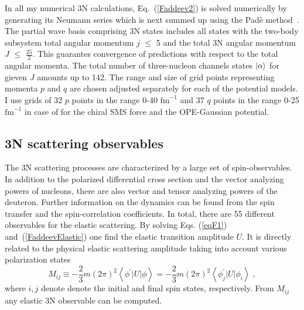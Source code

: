 In all my numerical 3N calculations, Eq.~(\ref{Faddeev2}) is solved numerically by generating its Neumann series which
is next summed up using the Pad\`e method~\cite{Glockle1996, glockle1983quantum}. The partial wave basis comprising 3N states includes all states with the two-body subsystem total angular momentum $j$ $\leq$ 5 and the total 3N angular momentum $J$ $\leq$ $\frac{25}{2}$. This guarantes convergence of predictions with respect to the total angular momenta. The total number of three-nucleon channels states $\ket{\alpha}$ for gieven $J$ amounts up to 142. The range and size of grid points representing momenta $p$ and $q$ are chosen adjusted separately for each of the potential models. I use grids of 32 $p$ points in the range 0-40 $\mathrm{fm}^{-1}$ and 37 $q$ points in the range 0-25 $\mathrm{fm}^{-1}$ in case of for the chiral SMS force and the OPE-Gaussian potential.  
%

\subsection{3N scattering observables}
The 3N scattering processes are characterized by a large set of spin-observables. In addition to the polarized differential cross section and the vector analyzing powers of nucleons, there are also vector and tensor analyzing powers of the deuteron. Further
information on the dynamics can be found from the spin transfer and the spin-correlation coefficients. In total, there are 55 different observables for the elastic scattering.
By solving Eqs. (\ref{eqF1}) and~(\ref{FaddeevElastic}) one find the elastic transition amplitude $U$. It is directly related to the physical elastic scattering amplitude taking into account various polarization states
\begin{equation}
M_{ij} \equiv -\frac{2}{3}m(2\pi)^{2}\left<\phi^{\prime}|U|\phi\right> = -\frac{2}{3}m(2\pi)^{2}\left<\phi^{\prime}_{j}|U|\phi_{i}\right>\;,
\end{equation}
where $i,j$ denote denote the initial and final spin states, respectively. From $M_{ij}$ any elastic 3N observable can be computed.

